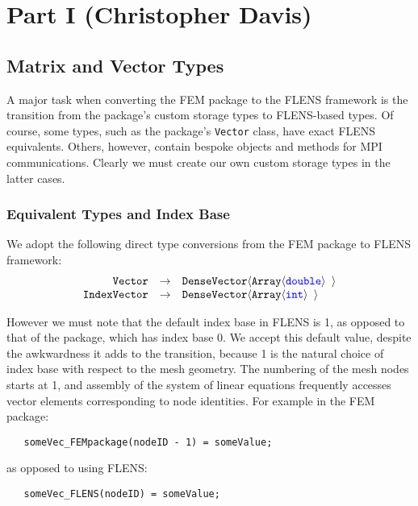 \section{Part I (Christopher Davis)}

\subsection{Matrix and Vector Types}

A major task when converting the FEM package to the FLENS framework is the transition from the package's custom storage types to FLENS-based types. Of course, some types, such as the package's \texttt{Vector} class, have exact FLENS equivalents. Others, however, contain bespoke objects and methods for MPI communications. Clearly we must create our own custom storage types in the latter cases.

\subsubsection{Equivalent Types and Index Base}

We adopt the following direct type conversions from the FEM package to FLENS framework:
\begin{equation*}
\begin{array}{rcl}
   \mbox{\texttt{Vector}}  &  \rightarrow  &  \mbox{\texttt{DenseVector$\langle$Array$\langle${\color{blue}double}$\rangle$ $\rangle$}} \\
   \mbox{\texttt{IndexVector}} & \rightarrow & \mbox{\texttt{DenseVector$\langle$Array$\langle${\color{blue}int}$\rangle$ $\rangle$}}
\end{array}
\end{equation*}

However we must note that the default index base in FLENS is 1, as opposed to that of the package, which has index base 0. We accept this default value, despite the awkwardness it adds to the transition, because 1 is the natural choice of index base with respect to the mesh geometry. The numbering of the mesh nodes starts at 1, and assembly of the system of linear equations frequently accesses vector elements corresponding to node identities. For example in the FEM package:

\begin{lstlisting}
   someVec_FEMpackage(nodeID - 1) = someValue;
\end{lstlisting}

as opposed to using FLENS:

\begin{lstlisting}
   someVec_FLENS(nodeID) = someValue;
\end{lstlisting}

